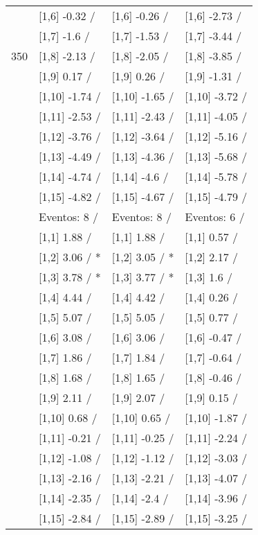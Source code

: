 \begin{table}
\begin{tabular}[t]{llll}
 & {}[1,6] -0.32  / & {}[1,6] -0.26  / & {}[1,6] -2.73  /\\
 & {}[1,7] -1.6  / & {}[1,7] -1.53  / & {}[1,7] -3.44  /\\
350 & {}[1,8] -2.13  / & {}[1,8] -2.05  / & {}[1,8] -3.85  /\\
\addlinespace
 & {}[1,9] 0.17  / & {}[1,9] 0.26  / & {}[1,9] -1.31  /\\
 & {}[1,10] -1.74  / & {}[1,10] -1.65  / & {}[1,10] -3.72  /\\
 & {}[1,11] -2.53  / & {}[1,11] -2.43  / & {}[1,11] -4.05  /\\
 & {}[1,12] -3.76  / & {}[1,12] -3.64  / & {}[1,12] -5.16  /\\
 & {}[1,13] -4.49  / & {}[1,13] -4.36  / & {}[1,13] -5.68  /\\
\addlinespace
 & {}[1,14] -4.74  / & {}[1,14] -4.6  / & {}[1,14] -5.78  /\\
 & {}[1,15] -4.82  / & {}[1,15] -4.67  / & {}[1,15] -4.79  /\\
 & Eventos:  8 / & Eventos:  8 / & Eventos:  6 /\\
 & {}[1,1] 1.88  / & {}[1,1] 1.88  / & {}[1,1] 0.57  /\\
 & {}[1,2] 3.06  / * & {}[1,2] 3.05  / * & {}[1,2] 2.17  /\\
\addlinespace
 & {}[1,3] 3.78  / * & {}[1,3] 3.77  / * & {}[1,3] 1.6  /\\
 & {}[1,4] 4.44  / & {}[1,4] 4.42  / & {}[1,4] 0.26  /\\
 & {}[1,5] 5.07  / & {}[1,5] 5.05  / & {}[1,5] 0.77  /\\
 & {}[1,6] 3.08  / & {}[1,6] 3.06  / & {}[1,6] -0.47  /\\
 & {}[1,7] 1.86  / & {}[1,7] 1.84  / & {}[1,7] -0.64  /\\
\addlinespace
500 & {}[1,8] 1.68  / & {}[1,8] 1.65  / & {}[1,8] -0.46  /\\
 & {}[1,9] 2.11  / & {}[1,9] 2.07  / & {}[1,9] 0.15  /\\
 & {}[1,10] 0.68  / & {}[1,10] 0.65  / & {}[1,10] -1.87  /\\
 & {}[1,11] -0.21  / & {}[1,11] -0.25  / & {}[1,11] -2.24  /\\
 & {}[1,12] -1.08  / & {}[1,12] -1.12  / & {}[1,12] -3.03  /\\
\addlinespace
 & {}[1,13] -2.16  / & {}[1,13] -2.21  / & {}[1,13] -4.07  /\\
 & {}[1,14] -2.35  / & {}[1,14] -2.4  / & {}[1,14] -3.96  /\\
 & {}[1,15] -2.84  / & {}[1,15] -2.89  / & {}[1,15] -3.25  /\\
\bottomrule
\end{tabular}
\end{table}
